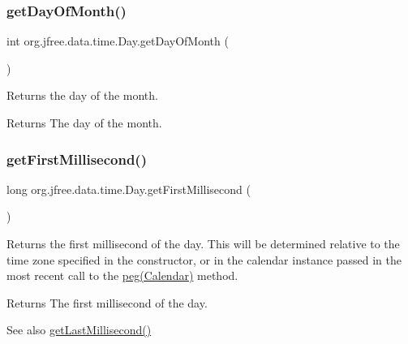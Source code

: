 \subsubsection{\texorpdfstring{get\+Day\+Of\+Month()}{getDayOfMonth()}}
{\footnotesize\ttfamily int org.\+jfree.\+data.\+time.\+Day.\+get\+Day\+Of\+Month (\begin{DoxyParamCaption}{ }\end{DoxyParamCaption})}

Returns the day of the month.

\begin{DoxyReturn}{Returns}
The day of the month. 
\end{DoxyReturn}
\mbox{\label{classorg_1_1jfree_1_1data_1_1time_1_1_day_a749a1d827eea6ad8374db0746d87e30b}} 
\subsubsection{\texorpdfstring{get\+First\+Millisecond()}{getFirstMillisecond()}\hspace{0.1cm}{\footnotesize\ttfamily [1/2]}}
{\footnotesize\ttfamily long org.\+jfree.\+data.\+time.\+Day.\+get\+First\+Millisecond (\begin{DoxyParamCaption}{ }\end{DoxyParamCaption})}

Returns the first millisecond of the day. This will be determined relative to the time zone specified in the constructor, or in the calendar instance passed in the most recent call to the \mbox{\hyperlink{classorg_1_1jfree_1_1data_1_1time_1_1_day_aec3e06803aa5e7984df40e3d90ae67d5}{peg(\+Calendar)}} method.

\begin{DoxyReturn}{Returns}
The first millisecond of the day.
\end{DoxyReturn}
\begin{DoxySeeAlso}{See also}
\mbox{\hyperlink{classorg_1_1jfree_1_1data_1_1time_1_1_day_ac4c355e60db625a16590787e50c96800}{get\+Last\+Millisecond()}} 
\end{DoxySeeAlso}
\mbox{\label{classorg_1_1jfree_1_1data_1_1time_1_1_day_a78659c479b54234383d2aca252f5256b}} 
